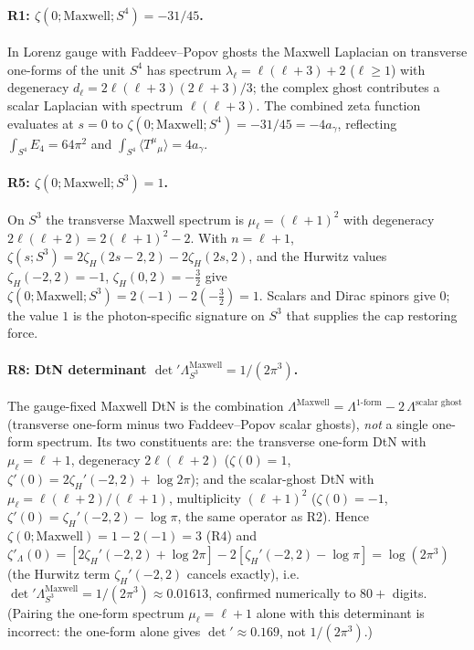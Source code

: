\documentclass[11pt,a4paper]{article}
\theoremstyle{plain}
\theoremstyle{definition}
\theoremstyle{remark}
\newcommand{\ag}{a_\gamma}
\newcommand{\avg}[1]{\langle #1 \rangle}
\begin{document}
\paragraph{R1: $\zeta(0;\mathrm{Maxwell};S^4) = -31/45$.}
In Lorenz gauge with Faddeev--Popov ghosts the Maxwell Laplacian on transverse one-forms of the
unit $S^4$ has spectrum $\lambda_\ell = \ell(\ell+3)+2$ ($\ell\ge1$) with degeneracy
$d_\ell = 2\ell(\ell+3)(2\ell+3)/3$; the complex ghost contributes a scalar Laplacian with
spectrum $\ell(\ell+3)$. The combined zeta function evaluates at $s=0$ to
$\zeta(0;\mathrm{Maxwell};S^4) = -31/45 = -4\ag$, reflecting $\int_{S^4} E_4 = 64\pi^2$ and
$\int_{S^4}\avg{T^\mu{}_\mu} = 4\ag$.

\paragraph{R5: $\zeta(0;\mathrm{Maxwell};S^3) = 1$.}
On $S^3$ the transverse Maxwell spectrum is $\mu_\ell = (\ell+1)^2$ with degeneracy
$2\ell(\ell+2) = 2(\ell+1)^2 - 2$. With $n = \ell+1$,
$\zeta(s;S^3) = 2\zeta_H(2s-2,2) - 2\zeta_H(2s,2)$, and the Hurwitz values
$\zeta_H(-2,2) = -1$, $\zeta_H(0,2) = -\tfrac32$ give
$\zeta(0;\mathrm{Maxwell};S^3) = 2(-1) - 2(-\tfrac32) = 1$. Scalars and Dirac spinors give $0$;
the value $1$ is the photon-specific signature on $S^3$ that supplies the cap restoring force.

\paragraph{R8: DtN determinant $\det{}'\Lambda_{S^3}^{\mathrm{Maxwell}} = 1/(2\pi^3)$.}
The gauge-fixed Maxwell DtN is the combination
$\Lambda^{\mathrm{Maxwell}} = \Lambda^{\text{1-form}} - 2\,\Lambda^{\text{scalar ghost}}$ (transverse
one-form minus two Faddeev--Popov scalar ghosts), \emph{not} a single one-form spectrum. Its two
constituents are: the transverse one-form DtN with $\mu_\ell = \ell+1$, degeneracy $2\ell(\ell+2)$
($\zeta(0)=1$, $\zeta'(0) = 2\zeta_H'(-2,2)+\log 2\pi$); and the scalar-ghost DtN with
$\mu_\ell = \ell(\ell+2)/(\ell+1)$, multiplicity $(\ell+1)^2$ ($\zeta(0)=-1$,
$\zeta'(0) = \zeta_H'(-2,2)-\log\pi$, the same operator as R2). Hence
$\zeta(0;\mathrm{Maxwell}) = 1 - 2(-1) = 3$ (R4) and
$\zeta'_\Lambda(0) = [2\zeta_H'(-2,2)+\log 2\pi] - 2[\zeta_H'(-2,2)-\log\pi] = \log(2\pi^3)$
(the Hurwitz term $\zeta_H'(-2,2)$ cancels exactly), i.e.\
$\det{}'\Lambda_{S^3}^{\mathrm{Maxwell}} = 1/(2\pi^3) \approx 0.01613$, confirmed numerically to
$80+$ digits. (Pairing the one-form spectrum $\mu_\ell=\ell+1$ alone with this determinant is
incorrect: the one-form alone gives $\det{}' \approx 0.169$, not $1/(2\pi^3)$.)
\end{document}
